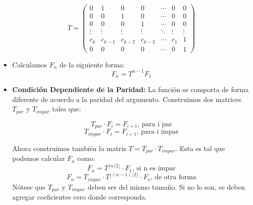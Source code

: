 \begin{itemize}
{\begin{itemize}
{					$$ T = 
						\begin{pmatrix}
							0 & 1 & 0 & 0 & \cdots	& 0	& 0	\\
							0 & 0 & 1 & 0 & \cdots	& 0	& 0 \\
							0 & 0 & 0 & 1 & \cdots	& 0	& 0 \\
							\vdots & \vdots &\vdots &\vdots & \ddots & \vdots & \vdots		\\	
							c_k & c_{k-1} & c_{k-2} & c_{k-3} & \cdots & c_1 & 1				\\
							0 & 0 & 0 & 0 & \cdots & 0 & 1
						\end{pmatrix}
				 	$$
 				}
			\end{itemize}
    }
    \item{
		Calculamos $F_n$ de la siguiente forma:
		$$ F_n = T^{n-1}F_1 $$ 
    }
    \item{
		\textbf{Condici\'on Dependiente de la Paridad: } 
		La funci\'on se comporta de forma diferente de acuerdo a la paridad del argumento.
		Construimos dos matrices $T_{par}$ y $T_{impar}$ tales que:
		
		$$ T_{par} \cdot F_i = F_{i+1} \text{, para i par} $$
		$$ T_{impar} \cdot F_i = F_{i+1} \text{, para i impar} $$ 
		
		Ahora construimos tambi\'en la matriz $T = T_{par} \cdot T_{impar}$. Esta es tal que podemos calcular 
		$F_n$ como:
		$$ F_n = T^{\lfloor n/2 \rfloor} \cdot F_1 \text{, si n es impar} $$   
		$$ F_n = T_{impar} \cdot T^{\lfloor (n-1)/2 \rfloor} \cdot F_1 \text{, de otra forma} $$   
		N\'otese que $T_{par}$ y $T_{impar}$ deben ser del mismo tama\~no. Si no lo son, se deben agregar 
		coeficientes cero donde corresponda.
    }
    
\end{itemize}
